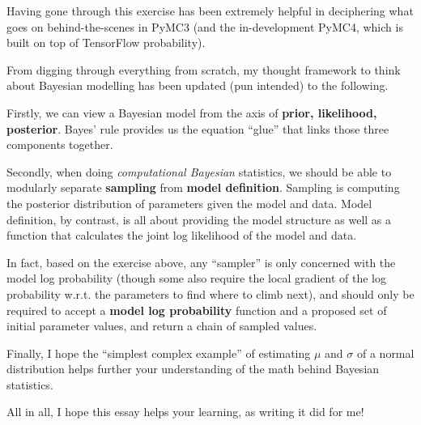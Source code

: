 Having gone through this exercise has been extremely helpful in deciphering what goes on behind-the-scenes in PyMC3 (and the in-development PyMC4, which is built on top of TensorFlow probability).

From digging through everything from scratch, my thought framework to think about Bayesian modelling has been updated (pun intended) to the following.

Firstly, we can view a Bayesian model from the axis of \textbf{prior, likelihood, posterior}. Bayes' rule provides us the equation ``glue'' that links those three components together.

Secondly, when doing \emph{computational Bayesian} statistics, we should be able to modularly separate \textbf{sampling} from \textbf{model definition}. Sampling is computing the posterior distribution of parameters given the model and data. Model definition, by contrast, is all about providing the model structure as well as a function that calculates the joint log likelihood of the model and data.

In fact, based on the exercise above, any ``sampler'' is only concerned with the model log probability (though some also require the local gradient of the log probability w.r.t. the parameters to find where to climb next), and should only be required to accept a \textbf{model log probability} function and a proposed set of initial parameter values, and return a chain of sampled values.

Finally, I hope the ``simplest complex example'' of estimating $\mu$ and $\sigma$ of a normal distribution helps further your understanding of the math behind Bayesian statistics.

All in all, I hope this essay helps your learning, as writing it did for me!